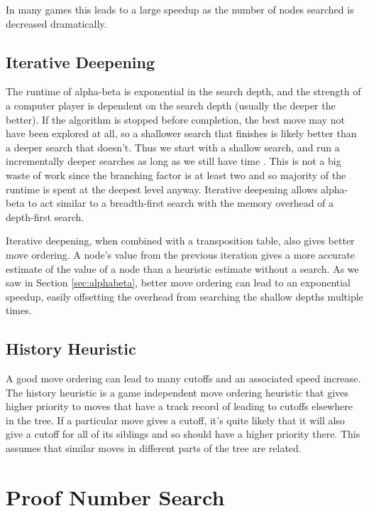 In many games this leads to a large speedup as the number of nodes searched is decreased dramatically.


\subsection{Iterative Deepening}

The runtime of alpha-beta is exponential in the search depth, and the strength of a computer player is dependent on the search depth (usually the deeper the better). If the algorithm is stopped before completion, the best move may not have been explored at all, so a shallower search that finishes is likely better than a deeper search that doesn't. Thus we start with a shallow search, and run a incrementally deeper searches as long as we still have time \cite{slate1977chess}. This is not a big waste of work since the branching factor is at least two and so majority of the runtime is spent at the deepest level anyway. Iterative deepening allows alpha-beta to act similar to a breadth-first search with the memory overhead of a depth-first search.

Iterative deepening, when combined with a transposition table, also gives better move ordering. A node's value from the previous iteration gives a more accurate estimate of the value of a node than a heuristic estimate without a search. As we saw in Section \ref{sec:alphabeta}, better move ordering can lead to an exponential speedup, easily offsetting the overhead from searching the shallow depths multiple times.

\subsection{History Heuristic}

A good move ordering can lead to many cutoffs and an associated speed increase. The history heuristic \cite{schaeffer1989history} is a game independent move ordering heuristic that gives higher priority to moves that have a track record of leading to cutoffs elsewhere in the tree. If a particular move gives a cutoff, it's quite likely that it will also give a cutoff for all of its siblings and so should have a higher priority there. This assumes that similar moves in different parts of the tree are related.




\section{Proof Number Search} \label{sec:PNS}

